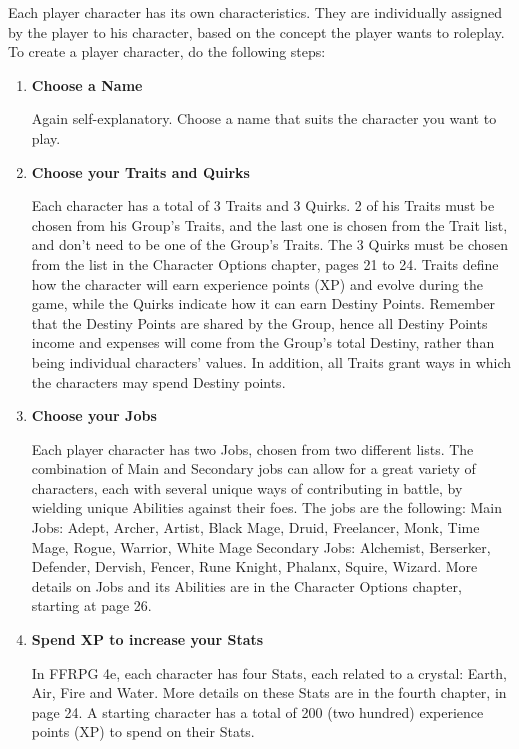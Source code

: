 \begin{multicols}{2}
Each player character has its own
characteristics. They are individually assigned by
the player to his character, based on the concept
the player wants to roleplay. To create a player
character, do the following steps:
\begin{enumerate}
\item \textbf{Choose a Name}

Again self-explanatory. Choose a name that
suits the character you want to play.

\item \textbf{Choose your Traits and Quirks}

Each character has a total of 3 Traits and 3
Quirks. 2 of his Traits must be chosen from his
Group’s Traits, and the last one is chosen from the
Trait list, and don’t need to be one of the Group's
Traits. The 3 Quirks must be chosen from the list
in the Character Options chapter, pages 21 to 24.
Traits define how the character will earn
experience points (XP) and evolve during the game,
while the Quirks indicate how it can earn Destiny
Points. Remember that the Destiny Points are
shared by the Group, hence all Destiny Points
income and expenses will come from the Group's
total Destiny, rather than being individual
characters’ values. In addition, all Traits grant
ways in which the characters may spend Destiny
points.

\item \textbf{Choose your Jobs}

Each player character has two Jobs, chosen
from two different lists. The combination of Main
and Secondary jobs can allow for a great variety of
characters, each with several unique ways of
contributing in battle, by wielding unique Abilities
against their foes. The jobs are the following:
Main Jobs: Adept, Archer, Artist, Black Mage,
Druid, Freelancer, Monk, Time Mage, Rogue,
Warrior, White Mage
Secondary Jobs: Alchemist, Berserker, Defender,
Dervish, Fencer, Rune Knight, Phalanx, Squire,
Wizard.
More details on Jobs and its Abilities are in the
Character Options chapter, starting at page 26.

\item \textbf{Spend XP to increase your Stats}

In FFRPG 4e, each character has four Stats,
each related to a crystal: Earth, Air, Fire and Water.
More details on these Stats are in the fourth
chapter, in page 24. A starting character has a total
of 200 (two hundred) experience points (XP) to
spend on their Stats.


\end{enumerate}
\end{multicols}
